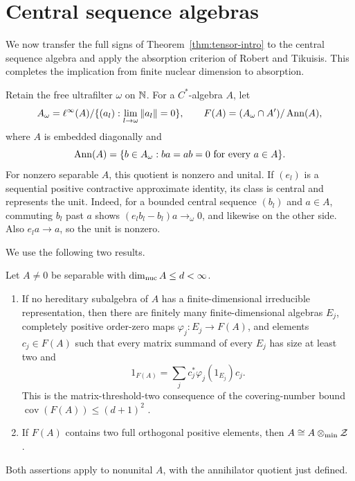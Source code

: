 \section{Central sequence algebras}\label{sec:central}
We now transfer the full signs of Theorem~\ref{thm:tensor-intro} to the
central sequence algebra and apply the absorption criterion of Robert
and Tikuisis. This completes the implication from finite nuclear dimension
to absorption.

Retain the free ultrafilter \(\omega\) on \(\mathbb N\). For a \(C^*\)-algebra \(A\), let
\[
 A_\omega=\ell^\infty(A)/\{(a_l):\lim_{l\to\omega}\|a_l\|=0\},\qquad
 F(A)=(A_\omega\cap A')/\operatorname{Ann}(A),
\]
where \(A\) is embedded diagonally and
\[
 \operatorname{Ann}(A)=\{b\in A_\omega:ba=ab=0\text{ for every }a\in A\}.
\]
For nonzero separable \(A\), this quotient is nonzero and unital. If \((e_l)\) is a sequential positive contractive approximate identity, its class is central and represents the unit. Indeed, for a bounded central sequence \((b_l)\) and \(a\in A\), commuting \(b_l\) past \(a\) shows \((e_lb_l-b_l)a\to_\omega0\), and likewise on the other side. Also \(e_la\to a\), so the unit is nonzero.

We use the following two results.
\begin{theorem}\label{thm:imports}
Let \(A\ne0\) be separable with \(\dim_{\mathrm{nuc}} A\leq d<\infty\).
\begin{enumerate}
\item If no hereditary subalgebra of \(A\) has a finite-dimensional
irreducible representation, then there are finitely many finite-dimensional
algebras $E_j$, completely positive order-zero maps
$\varphi_j:E_j\to F(A)$, and elements $c_j\in F(A)$ such that every
matrix summand of every $E_j$ has size at least two and
\[
 1_{F(A)}=\sum_jc_j^*\varphi_j(1_{E_j})c_j.
\]
This is the matrix-threshold-two consequence of the covering-number
bound $\operatorname{cov}(F(A))\le(d+1)^2$
\cite[Definition~4.1 and Proposition~4.3]{WZNuclear}.
\item If \(F(A)\) contains two full orthogonal positive elements, then \(A\cong A\otimes_{\min}\mathcal Z\) \cite[Theorem 1.2]{RT}.
\end{enumerate}
Both assertions apply to nonunital \(A\), with the annihilator quotient just defined.
\end{theorem}


